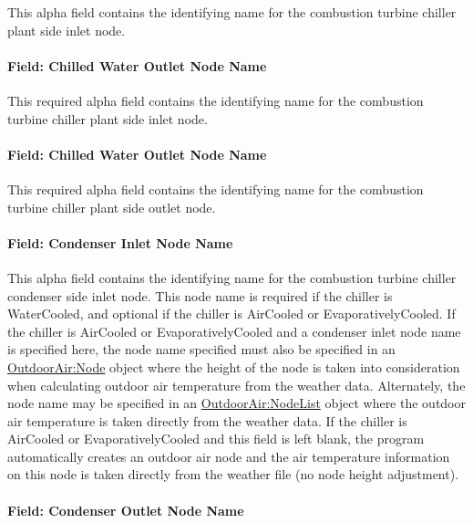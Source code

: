 This alpha field contains the identifying name for the combustion turbine chiller plant side inlet node.

\paragraph{Field: Chilled Water Outlet Node Name}\label{field-chilled-water-outlet-node-name-6}

This required alpha field contains the identifying name for the combustion turbine chiller plant side inlet node.

\paragraph{Field: Chilled Water Outlet Node Name}\label{field-chilled-water-outlet-node-name-7}

This required alpha field contains the identifying name for the combustion turbine chiller plant side outlet node.

\paragraph{Field: Condenser Inlet Node Name}\label{field-condenser-inlet-node-name-6}

This alpha field contains the identifying name for the combustion turbine chiller condenser side inlet node. This node name is required if the chiller is WaterCooled, and optional if the chiller is AirCooled or EvaporativelyCooled. If the chiller is AirCooled or EvaporativelyCooled and a condenser inlet node name is specified here, the node name specified must also be specified in an \hyperref[outdoorairnode]{OutdoorAir:Node} object where the height of the node is taken into consideration when calculating outdoor air temperature from the weather data. Alternately, the node name may be specified in an \hyperref[outdoorairnodelist]{OutdoorAir:NodeList} object where the outdoor air temperature is taken directly from the weather data. If the chiller is AirCooled or EvaporativelyCooled and this field is left blank, the program automatically creates an outdoor air node and the air temperature information on this node is taken directly from the weather file (no node height adjustment).

\paragraph{Field: Condenser Outlet Node Name}\label{field-condenser-outlet-node-name-6}

